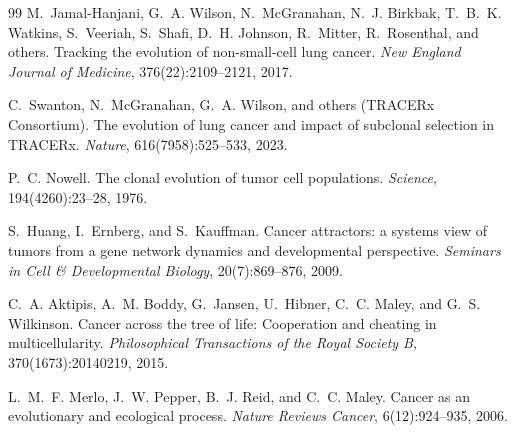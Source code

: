 \documentclass[11pt]{article}
\begin{document}
\begin{thebibliography}{99}
M.~Jamal-Hanjani, G.~A. Wilson, N.~McGranahan, N.~J. Birkbak,
  T.~B.~K. Watkins, S.~Veeriah, S.~Shafi, D.~H. Johnson,
  R.~Mitter, R.~Rosenthal, and others.
\newblock Tracking the evolution of non-small-cell lung cancer.
\newblock \emph{New England Journal of Medicine}, 376(22):2109--2121, 2017.

C.~Swanton, N.~McGranahan, G.~A. Wilson, and others (TRACERx Consortium).
\newblock The evolution of lung cancer and impact of subclonal selection
  in {TRACERx}.
\newblock \emph{Nature}, 616(7958):525--533, 2023.

P.~C. Nowell.
\newblock The clonal evolution of tumor cell populations.
\newblock \emph{Science}, 194(4260):23--28, 1976.

S.~Huang, I.~Ernberg, and S.~Kauffman.
\newblock Cancer attractors: a systems view of tumors from a gene network
  dynamics and developmental perspective.
\newblock \emph{Seminars in Cell \& Developmental Biology}, 20(7):869--876,
  2009.

C.~A. Aktipis, A.~M. Boddy, G.~Jansen, U.~Hibner, C.~C. Maley, and
  G.~S. Wilkinson.
\newblock Cancer across the tree of life: Cooperation and cheating in
  multicellularity.
\newblock \emph{Philosophical Transactions of the Royal Society B},
  370(1673):20140219, 2015.

L.~M.~F. Merlo, J.~W. Pepper, B.~J. Reid, and C.~C. Maley.
\newblock Cancer as an evolutionary and ecological process.
\newblock \emph{Nature Reviews Cancer}, 6(12):924--935, 2006.

\end{thebibliography}

\clearpage
\appendix
\end{document}

